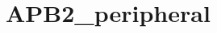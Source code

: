 \hypertarget{group___a_p_b2__peripheral}{\section{A\-P\-B2\-\_\-peripheral}
\label{group___a_p_b2__peripheral}
}
